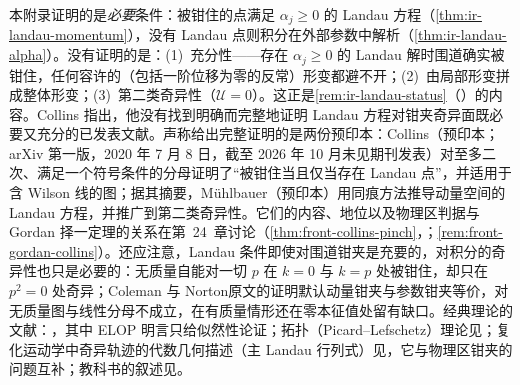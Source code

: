 本附录证明的是\emph{必要}条件：被钳住的点满足 $\alpha_j\ge0$ 的 Landau 方程（\cref{thm:ir-landau-momentum}），没有 Landau 点则积分在外部参数中解析（\cref{thm:ir-landau-alpha}）。没有证明的是：(1)~充分性——存在 $\alpha_j\ge0$ 的 Landau 解时围道确实被钳住，任何容许的（包括一阶位移为零的反常）形变都避不开；(2)~由局部形变拼成整体形变；(3)~第二类奇异性（$\mathcal U=0$）。这正是\cref{rem:ir-landau-status}（\tagA）的内容。Collins 指出，他没有找到明确而完整地证明 Landau 方程对钳夹奇异面既必要又充分的已发表文献\cite[第~5.4.3~节，第~110~页]{Collins2011}。声称给出完整证明的是两份预印本：Collins\cite{Collins:2020euz}（预印本；arXiv 第一版，2020 年 7 月 8 日，截至 2026 年 10 月未见期刊发表）对至多二次、满足一个符号条件的分母证明了“被钳住当且仅当存在 Landau 点”，并适用于含 Wilson 线的图；据其摘要，Mühlbauer\cite{Muhlbauer:2020kut}（预印本）用同痕方法推导动量空间的 Landau 方程，并推广到第二类奇异性。它们的内容、地位以及物理区判据与 Gordan 择一定理的关系在第~24~章讨论（\cref{thm:front-collins-pinch}，\tagA；\cref{rem:front-gordan-collins}）。还应注意，Landau 条件即使对围道钳夹是充要的，对积分的奇异性也只是必要的：无质量自能对一切 $p$ 在 $k=0$ 与 $k=p$ 处被钳住，却只在 $p^2=0$ 处奇异；Coleman 与 Norton\cite{ColemanNorton1965}原文的证明默认动量钳夹与参数钳夹等价，对无质量图与线性分母不成立，在有质量情形还在零本征值处留有缺口\cite[第~IV~节、附录~D]{Collins:2020euz}。经典理论的文献：\cite{Landau1959,Nakanishi:1959jzx,EdenEtAl1966}，其中 ELOP 明言只给似然性论证\cite[第~2.1~节，第~48~页]{EdenEtAl1966}；拓扑（Picard--Lefschetz）理论见\cite{Pham:2011SingInt}；复化运动学中奇异轨迹的代数几何描述（主 Landau 行列式）见\cite{Fevola:2023kaw}，它与物理区钳夹的问题互补；教科书的叙述见\cite[第~13~章]{Sterman1993}。
